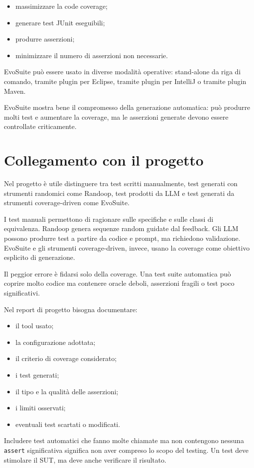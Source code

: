 \begin{itemize}
    \item massimizzare la code coverage;
    \item generare test JUnit eseguibili;
    \item produrre asserzioni;
    \item minimizzare il numero di asserzioni non necessarie.
\end{itemize}

EvoSuite può essere usato in diverse modalità operative: stand-alone da riga di comando, tramite plugin per Eclipse, tramite plugin per IntelliJ o tramite plugin Maven.

\begin{notaesame}
EvoSuite mostra bene il compromesso della generazione automatica: può produrre molti test e aumentare la coverage, ma le asserzioni generate devono essere controllate criticamente.
\end{notaesame}

\section{Collegamento con il progetto}

Nel progetto è utile distinguere tra test scritti manualmente, test generati con strumenti randomici come Randoop, test prodotti da LLM e test generati da strumenti coverage-driven come EvoSuite.

I test manuali permettono di ragionare sulle specifiche e sulle classi di equivalenza. Randoop genera sequenze random guidate dal feedback. Gli LLM possono produrre test a partire da codice e prompt, ma richiedono validazione. EvoSuite e gli strumenti coverage-driven, invece, usano la coverage come obiettivo esplicito di generazione.

\begin{notaesame}
Il peggior errore è fidarsi solo della coverage. Una test suite automatica può coprire molto codice ma contenere oracle deboli, asserzioni fragili o test poco significativi.
\end{notaesame}

Nel report di progetto bisogna documentare:

\begin{itemize}
    \item il tool usato;
    \item la configurazione adottata;
    \item il criterio di coverage considerato;
    \item i test generati;
    \item il tipo e la qualità delle asserzioni;
    \item i limiti osservati;
    \item eventuali test scartati o modificati.
\end{itemize}

\begin{notaprof}
Includere test automatici che fanno molte chiamate ma non contengono nessuna \texttt{assert} significativa significa non aver compreso lo scopo del testing. Un test deve stimolare il SUT, ma deve anche verificare il risultato.
\end{notaprof}

